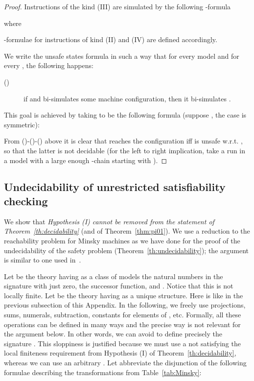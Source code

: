 \documentclass{LMCS}
\theoremstyle{plain}\newtheorem{assumption}[thm]{Assumption}
\theoremstyle{plain}\newtheorem{proposition}[thm]{Proposition}
\theoremstyle{plain}\newtheorem{property}[thm]{Property}
\theoremstyle{plain}\newtheorem{example}[thm]{Example}
\theoremstyle{plain}\newtheorem{claim}[thm]{Claim}
\theoremstyle{plain}\newtheorem{lemma}[thm]{Lemma}
\begin{document}
\begin{proof}
Instructions  of the kind (III) are simulated by the
following -formula

where

-formulae for instructions of kind (II) and (IV) are defined
accordingly.

We write the unsafe states formula  in such a way that for
every model  and for every , the
following happens:
\begin{description}
\item[{\rm ()}] if  and  bi-simulates some machine configuration,
  then it bi-simulates .
\end{description}
This goal is achieved by taking  to be the following
formula (suppose , the case  is symmetric):

From ()-()-() above it is clear that 
reaches the configuration  iff  is unsafe
w.r.t. , so
that the latter is not decidable (for the left to right implication, take a
  run in a model with a large enough -chain starting with ).
\end{proof}









\subsection*{Undecidability of unrestricted satisfiability checking}

We show that \emph{Hypothesis (I) cannot be removed from the statement
  of Theorem~\ref{th:decidability}} (and of Theorem~\ref{thm:pi01}).
We use 
a reduction to the reachability problem for Minsky machines as we have
done for the proof of the undecidability of the safety problem
(Theorem~\ref{th:undecidability}); the argument is similar to one used
in~\cite{arrays}.

Let  be the theory 
having as a class of models the
natural numbers in the signature with just
zero, the successor function, and .  Notice that this is not
locally finite.  Let  be the theory having  as a unique structure. Here  is like in the
previous subsection of this Appendix.  In the following, we freely use
projections, sums, numerals, subtraction, constants for elements of
, etc.  Formally, all these 
operations 
can be defined in many ways and the precise way is not
 relevant for the argument below.  In other words, we can avoid
to define precisely the signature .  
This sloppiness is justified because we
must use a 
 not satisfying the local finiteness requirement from Hypothesis (I) of
Theorem~\ref{th:decidability}, whereas we can use an arbitrary .  
Let  abbreviate
the disjunction of the following formulae describing the
transformations from Table~\ref{tab:Minsky}:
\end{document}

